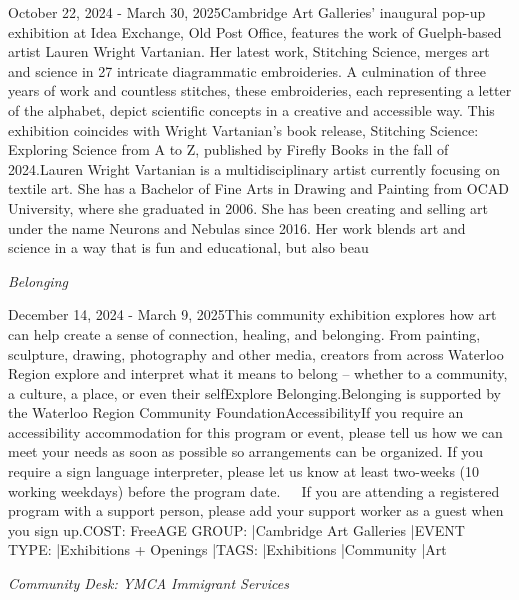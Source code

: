 \documentclass[letterpaper, 10pt]{article}
\newcommand{\subtitle}[1]{\textit{\large #1}\vspace{0.5em}}
\newcommand{\articlecontent}[1]{\small #1\vspace{1em}}
\begin{document}
\begin{multicols}{2}
{October 22, 2024 - March 30, 2025Cambridge Art Galleries' inaugural pop-up exhibition at Idea Exchange, Old Post Office, features the work of Guelph-based artist Lauren Wright Vartanian. Her latest work, Stitching Science, merges art and science in 27 intricate diagrammatic embroideries. A culmination of three years of work and countless stitches, these embroideries, each representing a letter of the alphabet, depict scientific concepts in a creative and accessible way. This exhibition coincides with Wright Vartanian’s book release, Stitching Science: Exploring Science from A to Z, published by Firefly Books in the fall of 2024.Lauren Wright Vartanian is a multidisciplinary artist currently focusing on textile art. She has a Bachelor of Fine Arts in Drawing and Painting from OCAD University, where she graduated in 2006. She has been creating and selling art under the name Neurons and Nebulas since 2016. Her work blends art and science in a way that is fun and educational, but also beau
}
\vspace{10px}

\subtitle{Belonging}

\articlecontent{

\qrcode[height=1.5cm]{https://ideaexchange.libnet.info/event/12094561}
\vspace{10px}

December 14, 2024 - March 9, 2025This community exhibition explores how art can help create a sense of connection, healing, and belonging. From painting, sculpture, drawing, photography and other media, creators from across Waterloo Region explore and interpret what it means to belong – whether to a community, a culture, a place, or even their selfExplore Belonging.Belonging is supported by the Waterloo Region Community FoundationAccessibilityIf you require an accessibility accommodation for this program or event, please tell us how we can meet your needs as soon as possible so arrangements can be organized. If you require a sign language interpreter, please let us know at least two-weeks (10 working weekdays) before the program date.   If you are attending a registered program with a support person, please add your support worker as a guest when you sign up.COST: FreeAGE GROUP: |Cambridge Art Galleries |EVENT TYPE: |Exhibitions + Openings |TAGS: |Exhibitions |Community |Art
}
\vspace{10px}

\subtitle{Community Desk: YMCA Immigrant Services}

\articlecontent{

}
\end{multicols}
\end{document}
